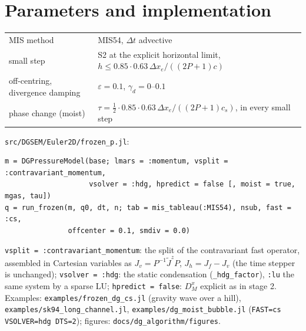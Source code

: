 \documentclass[11pt,a4paper]{article}
\newcommand{\dt}{\Delta t}
\newcommand{\code}[1]{\texttt{#1}}
\begin{document}
\section{Parameters and implementation}
\begin{center}\small
\begin{tabular}{ll}\toprule
MIS method & MIS54, $\dt$ advective \\
small step & S2 at the explicit horizontal limit, $h\le0.85\cdot0.63\,\Delta x_e/((2P+1)c)$ \\
off-centring, divergence damping & $\varepsilon=0.1$, $\gamma_d=0$--$0.1$ \\
phase change (moist) & $\tau=\tfrac12\cdot0.85\cdot0.63\,\Delta x_e/((2P+1)c_s)$, in every small step \\\bottomrule
\end{tabular}
\end{center}
\noindent\code{src/DGSEM/Euler2D/frozen\_p.jl}:
\begin{verbatim}
m = DGPressureModel(base; lmars = :momentum, vsplit = :contravariant_momentum,
                    vsolver = :hdg, hpredict = false [, moist = true, mgas, tau])
q = run_frozen(m, q0, dt, n; tab = mis_tableau(:MIS54), nsub, fast = :cs,
               offcenter = 0.1, smdiv = 0.0)
\end{verbatim}
\code{vsplit = :contravariant\_momentum}: the split of the contravariant fast operator, assembled in Cartesian variables as
$J_v=P^{-1}\tilde J^zP$, $J_h=J_f-J_v$ (the time stepper is unchanged); \code{vsolver = :hdg}: the static condensation (\code{\_hdg\_factor}),
\code{:lu} the same system by a sparse LU; \code{hpredict = false}: $D_M^x$ explicit as in stage 2. Examples: \code{examples/frozen\_dg\_cs.jl} (gravity
wave over a hill), \code{examples/sk94\_long\_channel.jl}, \code{examples/dg\_moist\_bubble.jl} (\code{FAST=cs VSOLVER=hdg DTS=2}); figures: \code{docs/dg\_algorithm/figures}.
\end{document}
